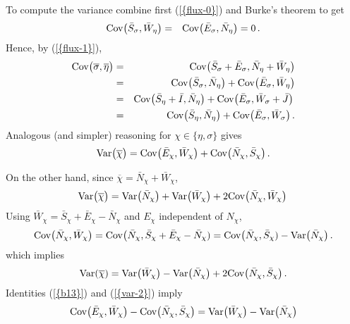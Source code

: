 \documentclass[reqno, 12pt]{amsart}
\begin{document}
To compute the variance combine first {(\ref{{flux-0}})} and Burke's theorem to get
\begin{eqnarray}
  \label{b4}
  {{\rm Cov}} \big({{\bar S}}_\sigma,{{\bar W}}_\eta\big)&=&{{\rm Cov}} \big({{\bar E}}_\sigma,{{\bar N}}_\eta\big)=0\,.
\end{eqnarray}
Hence, by {(\ref{{flux-1}})},
\begin{eqnarray}
  \label{b5}
  {{\rm Cov}} \big({{\overline \sigma}},{{\overline \eta}}\big)&=&{{\rm Cov}} \big({{\bar S}}_\sigma+{{\bar E}}_\sigma,{{\bar N}}_\eta+{{\bar W}}_\eta\big)\nonumber\\
&=&{{\rm Cov}} \big({{\bar S}}_\sigma,{{\bar N}}_\eta\big)+{{\rm Cov}} \big({{\bar E}}_\sigma,{{\bar W}}_\eta\big)\nonumber\\
&=&{{\rm Cov}} \big({{\bar S}}_\eta+{{\bar I}},{{\bar N}}_\eta\big)+{{\rm Cov}}\big({{\bar E}}_\sigma,{{\bar W}}_\sigma+{{\bar J}}\big)\,\nonumber\\
&=&{{\rm Cov}} \big({{\bar S}}_\eta,{{\bar N}}_\eta\big)+{{\rm Cov}} \big({{\bar E}}_\sigma,{{\bar W}}_\sigma\big)\,.\label{var-1}
\end{eqnarray}
Analogous (and simpler) reasoning for $\chi\in\{\eta,\sigma\}$ gives
\begin{equation}
  \label{b13}
  {{\rm Var}} \big({{\overline \chi}}\big)={{\rm Cov}} \big({{\bar E}}_\chi,{{\bar W}}_\chi\big)+{{\rm Cov}}
\big({{\bar N}}_\chi,{{\bar S}}_\chi\big)\,.
\end{equation}

On the other hand, since ${{\overline \chi}}={{\bar N}}_\chi+{{\bar W}}_\chi$,
\begin{equation}
  \label{b7}
 {{\rm Var}} \big({{\overline \chi}}\big)={{\rm Var}} \big({{\bar N}}_\chi \big)+{{\rm Var}} \big({{\bar W}}_\chi \big) + 2{{\rm Cov}} \big({{\bar N}}_\chi,{{\bar W}}_\chi\big)\,
\end{equation}
Using ${{\bar W}}_\chi={{\bar S}}_\chi+{{\bar E}}_\chi-{{\bar N}}_\chi$ and $E_\chi$ independent of
$N_\chi$,
$$
{{\rm Cov}} \big({{\bar N}}_\chi,{{\bar W}}_\chi\big)={{\rm Cov}} \big({{\bar N}}_\chi,{{\bar S}}_\chi+{{\bar E}}_\chi-{{\bar N}}_\chi)={{\rm Cov}} \big({{\bar N}}_\chi,{{\bar S}}_\chi)-{{\rm Var}} \big({{\bar N}}_\chi\big)\,.
$$
which implies
\begin{equation}\label{var-2}
{{\rm Var}} ({{\overline \chi}})={{\rm Var}} \big({{\bar W}}_\chi\big)-{{\rm Var}} \big({{\bar N}}_\chi\big) + 2{{\rm Cov}} \big({{\bar N}}_\chi,{{\bar S}}_\chi\big)\,.
\end{equation}
Identities {(\ref{{b13}})} and {(\ref{{var-2}})} imply
\begin{equation}
  \label{b14}
  {{\rm Cov}} \big({{\bar E}}_\chi,{{\bar W}}_\chi\big)-{{\rm Cov}}
  \big({{\bar N}}_\chi,{{\bar S}}_\chi\big) = {{\rm Var}} \big({{\bar W}}_\chi\big)-{{\rm Var}} \big({{\bar N}}_\chi\big)
\end{equation}
\end{document}
